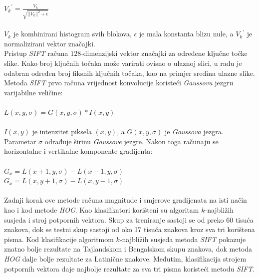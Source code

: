 ${V_k}^{'} = \frac{V_k}{\sqrt{{||V_k||}^2 + \epsilon}}$\\
\\
$V_k$ je kombinirani histogram svih blokova, $\epsilon$ je mala konstanta blizu nule, a ${V_k}^{'}$ je normalizirani
vektor značajki.\\
Pristup \emph{SIFT} računa $128$-dimenzijski vektor značajki za određene ključne točke slike. Kako broj ključnih točaka
može varirati ovisno o ulaznoj slici, u radu je odabran određen broj fiksnih ključnih točaka, kao na primjer sredina
ulazne slike. Metoda \emph{SIFT} prvo računa vrijednost konvolucije koristeći \emph{Gaussovu} jezgru varijabilne
veličine:\\
\\
$L(x, y, \sigma) = G(x, y, \sigma) * I(x, y)$\\
\\
$I(x, y)$ je intenzitet piksela $(x, y)$, a $G(x, y, \sigma)$ je \emph{Gaussova} jezgra. Parametar $\sigma$ odrađuje
širinu \emph{Gaussove} jezgre. Nakon toga računaju se horizontalne i vertikalne komponente gradijenta:\\
\\
$G_x = L(x + 1, y, \sigma) - L(x - 1, y, \sigma)$\\
$G_x = L(x, y + 1, \sigma) - L(x, y - 1, \sigma)$\\
\\
Zadnji korak ove metode računa magnitude i smjerove gradijenata na isti način kao i kod metode \emph{HOG}. Kao
klasifikatori korišteni su algoritam $k$-najbližih susjeda i stroj potpornih vektora. Skup za treniranje sastoji se od
preko 60 tisuća znakova, dok se testni skup sastoji od oko 17 tisuća znakova kroz sva tri korištena pisma. Kod
klasifikacije algoritmom $k$-najbližih susjeda metoda \emph{SIFT} pokazuje znatno bolje rezultate na Tajlandskom i
Bengalskom skupu znakova, dok metoda \emph{HOG} dalje bolje rezultate za Latinične znakove. Međutim, klasifikacija
strojem potpornih vektora daje najbolje rezultate za sva tri pisma koristeći metodu \emph{SIFT}.

